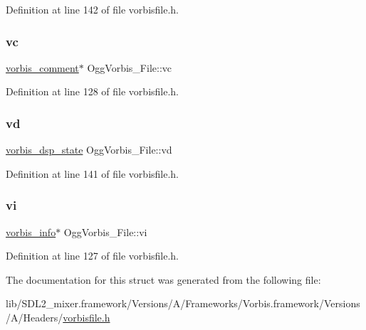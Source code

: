 Definition at line 142 of file vorbisfile.\+h.

\mbox{\label{struct_ogg_vorbis___file_a4467850c72aed93fe0a70e8f1fd6f20e}} 
\subsubsection{\texorpdfstring{vc}{vc}}
{\footnotesize\ttfamily \mbox{\hyperlink{structvorbis__comment}{vorbis\+\_\+comment}}$\ast$ Ogg\+Vorbis\+\_\+\+File\+::vc}



Definition at line 128 of file vorbisfile.\+h.

\mbox{\label{struct_ogg_vorbis___file_acb9d38719f54642d1a39f24203b466d6}} 
\subsubsection{\texorpdfstring{vd}{vd}}
{\footnotesize\ttfamily \mbox{\hyperlink{structvorbis__dsp__state}{vorbis\+\_\+dsp\+\_\+state}} Ogg\+Vorbis\+\_\+\+File\+::vd}



Definition at line 141 of file vorbisfile.\+h.

\mbox{\label{struct_ogg_vorbis___file_aa5586b939d7c31c8eec83cf1380b45a6}} 
\subsubsection{\texorpdfstring{vi}{vi}}
{\footnotesize\ttfamily \mbox{\hyperlink{structvorbis__info}{vorbis\+\_\+info}}$\ast$ Ogg\+Vorbis\+\_\+\+File\+::vi}



Definition at line 127 of file vorbisfile.\+h.



The documentation for this struct was generated from the following file\+:\begin{DoxyCompactItemize}
\item 
lib/\+S\+D\+L2\+\_\+mixer.\+framework/\+Versions/\+A/\+Frameworks/\+Vorbis.\+framework/\+Versions/\+A/\+Headers/\mbox{\hyperlink{vorbisfile_8h}{vorbisfile.\+h}}\end{DoxyCompactItemize}
